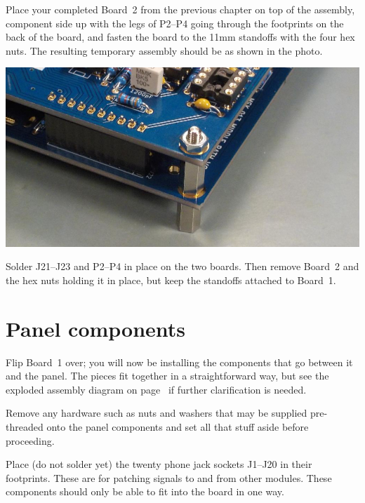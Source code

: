 Place your completed Board~2 from the previous chapter on top of the
assembly, component side up with the legs of P2--P4 going through the
footprints on the back of the board, and fasten the board to the 11mm
standoffs with the four hex nuts.  The resulting temporary assembly should
be as shown in the photo.

\nopagebreak
\noindent\includegraphics[width=\linewidth]{temp-assy.jpg}

Solder J21--J23 and P2--P4 in place on the two boards.  Then remove Board~2
and the hex nuts holding it in place, but keep the standoffs attached to
Board~1.

\section{Panel components}

Flip Board~1 over; you will now be installing the components that go between
it and the panel.  The pieces fit together in a straightforward way, but
see the exploded assembly diagram on page~\pageref{fig:exploded} if
further clarification is needed.

Remove any hardware such as nuts and washers that may be supplied
pre-threaded onto the panel components and set all that stuff aside before
proceeding.

Place (do not solder yet) the twenty phone jack sockets J1--J20 in
their footprints.  These are for patching signals to and from other modules. 
These components should only be able to fit into the board in one way.

